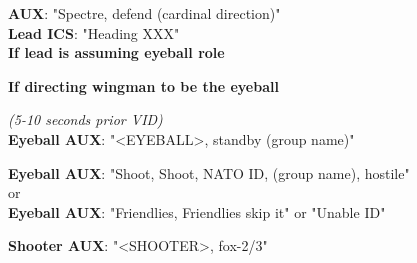 \textbf{AUX}: "Spectre, defend (cardinal direction)"\\
\textbf{Lead ICS}: "Heading XXX"\\

\textbf{If lead is assuming eyeball role}

\textbf{If directing wingman to be the eyeball}

\textit{(5-10 seconds prior VID)}\\
\textbf{Eyeball AUX}: "<EYEBALL>, standby (group name)"

\textbf{Eyeball AUX}: "Shoot, Shoot, NATO ID, (group name), hostile"\\
or\\
\textbf{Eyeball AUX}: "Friendlies, Friendlies skip it" or "Unable ID"

\textbf{Shooter AUX}: "<SHOOTER>, fox-2/3"

